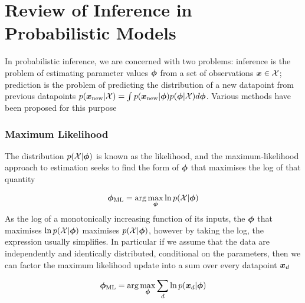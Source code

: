 

\newcommand \zd   { { \vv{z}_d } }
\newcommand \qfam { { \mathcal{Q} } }
\newcommand \xdat { { \mathcal{X} } }
\newcommand \zdat { { \mathcal{Z} } }
\newcommand \xnew { { \vv{x}_{\text{new}} } }
\newcommand \znew { { \vv{z}_{\text{new}} } }
\newcommand \param { { \vv{\phi} } }
\newcommand \ml[1] { { {#1}_{\text{ML}} } } 
\newcommand \map[1] { { {#1}_{\text{MAP}} } } 
\newcommand \quarter { { \oneover{4} } }
\newcommand \eighth { { \oneover{8} } }
\newcommand \fqt[1] { { \mathcal{F}\left( {#1} \right) } }
\newcommand \joint { { p(\xdat, \zdat | \param) } }
\newcommand \logjoint { { \ln \joint } }
\newcommand \exlogjoint[1] { { \ex{\logjoint}{{#1}} } }

\section{Review of Inference in Probabilistic Models}
In probabilistic inference, we are concerned with two problems: inference is the problem of estimating parameter values $\param$ from a set of observations $\vv{x} \in \xdat$; prediction is the problem of predicting the distribution of a new datapoint from previous datapoints $p(\xnew | \xdat) = \int p(\xnew | \param) p(\param | \xdat) d\param$. Various methods have been proposed for this purpose

\subsubsection*{Maximum Likelihood}
The distribution $p(\xdat|\param)$ is known as the likelihood, and the maximum-likelihood approach to estimation seeks to find the form of $\param$ that maximises the log of that quantity

\begin{align*}
\ml{\param} = \arg \max_{\param} \ln p(\xdat | \param)
\end{align*}
As the log of a monotonically increasing function of its inputs, the $\param$ that maximises $\ln p(\xdat | \param)$ maximises $p(\xdat | \param)$, however by taking the log, the expression usually simplifies. In particular if we assume that the data are independently and identically distributed, conditional on the parameters, then we can factor the maximum likelihood update into a sum over every datapoint ${ \bm x_d }$

\begin{align*}
\ml{\param} = \arg \max_{\param} \sum_d \ln p(\xd | \param)
\end{align*}

